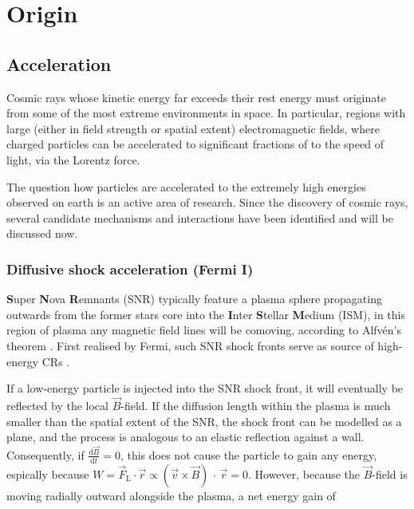 \section{Origin}
\label{sec:cr-origin}

\subsection{Acceleration}
\label{ssec:cr-acceleration}

Cosmic rays whose kinetic energy far exceeds their rest energy must originate from some of the most extreme environments in space. In particular, regions with 
large (either in field strength or spatial extent) electromagnetic fields, where charged particles can be accelerated to significant fractions of to the speed of 
light, via the Lorentz force. 

The question how particles are accelerated to the extremely high energies observed on earth is an active area of research. Since the discovery of cosmic rays, 
several candidate mechanisms and interactions have been identified and will be discussed now.

\subsubsection{Diffusive shock acceleration (Fermi I)}
\label{sssec:cr-fermi-i}

\textbf{S}uper \textbf{N}ova \textbf{R}emnants (SNR) typically feature a plasma sphere propagating outwards from the former stars core into the 
\textbf{I}nter \textbf{S}tellar \textbf{M}edium (ISM), in this region of plasma any magnetic field lines will be comoving, according to Alfvén's theorem 
\cite{alfven1942existence}. First realised by Fermi, such SNR shock fronts serve as source of high-energy CRs \cite{fermi1949origin}.

If a low-energy particle is injected into the SNR shock front, it will eventually be reflected by the local $\vec{B}$-field. If the diffusion length within the
plasma is much smaller than the spatial extent of the SNR, the shock front can be modelled as a plane, and the process is analogous to an elastic reflection 
against a wall. Consequently, if $\frac{\text{d}\vec{B}}{\text{d}t} = 0$, this does not cause the particle to gain any energy, espically because 
$W = \vec{F}_\text{L} \cdot \vec{r} \propto (\vec{v}\times\vec{B})\,\cdot\,\vec{r} = 0$. However, because the $\vec{B}$-field is moving radially outward alongside 
the plasma, a net energy gain of 

